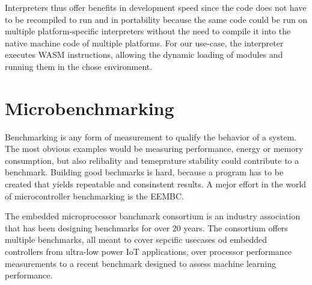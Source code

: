 Interpreters thus offer benefits in development speed since the code does not have to be recompiled to run and in portability because the same code could be run on multiple platform-specific interpreters without the need to compile it into the native machine code of multiple platforms. For our use-case, the interpreter executes WASM instructions, allowing the dynamic loading of modules and running them in the chose environment.
\section{Microbenchmarking}
Benchmarking is any form of measurement to qualify the behavior of a system. The most obvious examples would be measuring performance, energy or memory consumption, but also relibality and temeprature stability could contribute to a benchmark. Building good bechmarks is hard, because a program has to be created that yields repeatable and consinstent results. A mejor effort in the world of microcontroller benchmarking is the EEMBC.

The embedded microprocessor banchmark consortium is an industry association that has been designing benchmarks for over 20 years. The consortium offers multiple benchmarks, all meant to cover sepcific usecases od embedded controllers from ultra-low power IoT applications, over processor performance measurements to a recent benchmark designed to assess machine learning performance.